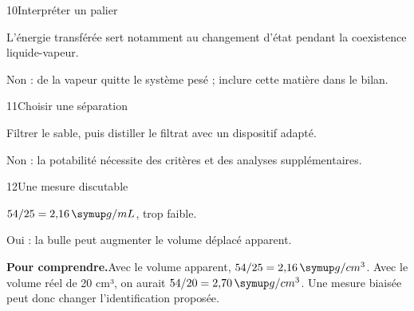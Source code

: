 \par\noindent\begin{minipage}{\linewidth}
\begin{corrige}{10}{Interpréter un palier}
\begin{questions}
\item L’énergie transférée sert notamment au changement d’état pendant la coexistence liquide-vapeur.
\item Non : de la vapeur quitte le système pesé ; inclure cette matière dans le bilan.
\end{questions}
\end{corrige}
\end{minipage}
\par\noindent\begin{minipage}{\linewidth}
\begin{corrige}{11}{Choisir une séparation}
\begin{questions}
\item Filtrer le sable, puis distiller le filtrat avec un dispositif adapté.
\item Non : la potabilité nécessite des critères et des analyses supplémentaires.
\end{questions}
\end{corrige}
\end{minipage}
\par\noindent\begin{minipage}{\linewidth}
\begin{corrige}{12}{Une mesure discutable}
\begin{questions}
\item $54/25=2{,}16\unite{g/mL}$, trop faible.
\item Oui : la bulle peut augmenter le volume déplacé apparent.
\end{questions}
\par\smallskip\noindent\textbf{Pour comprendre.}\enspace Avec le volume apparent, $54/25=2{,}16\unite{g/cm^3}$. Avec le volume réel de 20 cm³, on aurait $54/20=2{,}70\unite{g/cm^3}$. Une mesure biaisée peut donc changer l’identification proposée.\par
{}
\end{corrige}
\end{minipage}
